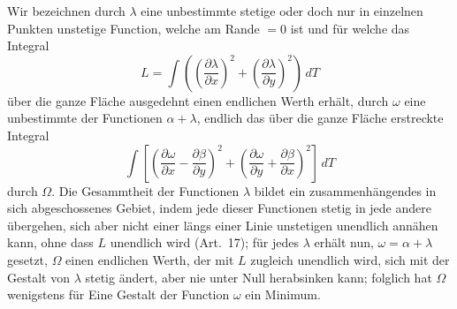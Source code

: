 \documentclass[a4paper,12pt]{article}
\begin{document}
Wir bezeichnen durch $\lambda$ eine unbestimmte stetige oder doch
nur in einzelnen Punkten unstetige Function, welche am Rande
$= 0$ ist und f\"{u}r welche das Integral
\[ L= \int
      \left(
         \left( \frac{\partial \lambda}{\partial x} \right)^2
       + \left( \frac{\partial \lambda}{\partial y} \right)^2
      \right) \, dT \]
\"{u}ber die ganze Fl\"{a}che ausgedehnt einen endlichen Werth
erh\"{a}lt, durch $\omega$ eine unbestimmte der Functionen
$\alpha + \lambda$, endlich das \"{u}ber die ganze Fl\"{a}che
erstreckte Integral
\[ \int
      \left[
         \left(
            \frac{\partial \omega}{\partial x}
          - \frac{\partial \beta }{\partial y}
         \right)^2
       + \left(
            \frac{\partial \omega}{\partial y}
          + \frac{\partial \beta }{\partial x}
         \right)^2
      \right] \, dT \]
durch $\Omega$.  Die Gesammtheit der Functionen $\lambda$ bildet
ein zusammenh\"{a}ngendes in sich abgeschossenes Gebiet, indem
jede dieser Functionen stetig in jede andere \"{u}bergehen, sich
aber nicht einer l\"{a}ngs einer Linie unstetigen unendlich
ann\"{a}hen kann, ohne dass $L$ unendlich wird (Art.~17); f\"{u}r
jedes $\lambda$ erh\"{a}lt nun, $\omega = \alpha + \lambda$
gesetzt, $\Omega$ einen endlichen Werth, der mit $L$ zugleich
unendlich wird, sich mit der Gestalt von $\lambda$ stetig
\"{a}ndert, aber nie unter Null herabsinken kann; folglich hat
$\Omega$ wenigstens f\"{u}r Eine Gestalt der Function $\omega$
ein Minimum.
\end{document}
